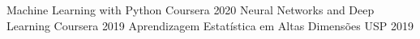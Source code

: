 
\begin{cvhonors}

  \cvhonor
    {Machine Learning with Python}
    {Coursera}
    {}
    {2020}
  \cvhonor
    {Neural Networks and Deep Learning}
    {Coursera}
    {}
    {2019}
  \cvhonor
    {Aprendizagem Estatística em Altas Dimensões}
    {USP}
    {}
    {2019}

    

\end{cvhonors}
